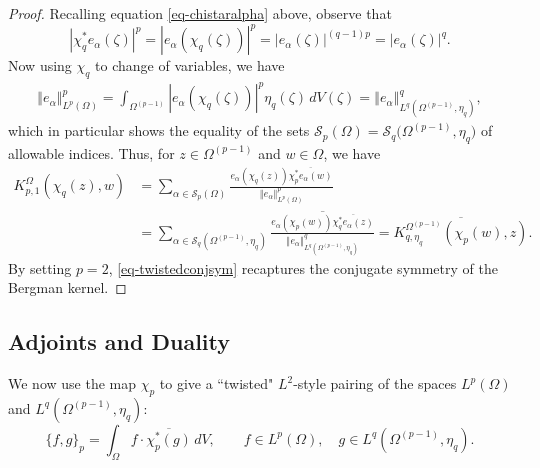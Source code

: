 \documentclass[letterpaper,11pt,reqno]{amsart}
\theoremstyle{plain}
\theoremstyle{definition}
\theoremstyle{remark}
\theoremstyle{remark}
\numberwithin{equation}{section}
\newcommand{\abs}[1]{\left\vert#1\right\vert}
\newcommand{\norm}[1]{\left\Vert#1\right\Vert}
\newcommand{\ol}{\overline}
\newcommand{\cs}{{\mathcal S}}
\begin{document}
\begin{proof}
Recalling equation \eqref{eq-chistaralpha} above, observe that
\[
\abs{\chi_q^* e_\alpha(\zeta)}^p= \abs{e_\alpha(\chi_q(\zeta))}^p = \abs{e_\alpha(\zeta)}^{(q-1)p} = \abs{e_\alpha(\zeta)}^q.
\]
Now using $\chi_q$ to change of variables, we have
\begin{align*} 
\norm{e_\alpha}^p_{L^p(\Omega)} 
= \int_{\Omega^{(p-1)}} \abs{e_\alpha(\chi_q(\zeta))}^p \eta_q(\zeta) \,dV(\zeta)
= \norm{e_\alpha}^q_{L^q(\Omega^{(p-1)},\eta_q)}, 
\end{align*}
which in particular shows the equality of the sets $\cs_p(\Omega) = \cs_q\big(\Omega^{(p-1)},\eta_q\big)$ of allowable indices. 
Thus, for $z \in \Omega^{(p-1)}$ and $w \in \Omega$, we have
\begin{align*}
K^{\Omega}_{p,1}\left(\chi_q(z),w\right)  
&= \sum_{\alpha \in \cs_p(\Omega)} \frac{e_\alpha(\chi_q(z)) \ol{\chi_p^* e_\alpha(w)}}{\norm{e_\alpha}_{L^p(\Omega)}^p} \\
&= \sum_{\alpha \in \cs_q(\Omega^{(p-1)},\eta_q)} \ol{\frac{ e_\alpha(\chi_p(w)) \ol{\chi_q^* e_\alpha(z)}}{\norm{e_\alpha}^q_{L^q(\Omega^{(p-1)},\eta_q)}} } 
= \ol{{K^{\Omega^{(p-1)}}_{q,\eta_q}(\chi_p(w),z)}}.
\end{align*}
By setting $p=2$, \eqref{eq-twistedconjsym} recaptures the conjugate symmetry of the Bergman kernel.
\end{proof}

\subsection{Adjoints and Duality}\label{SS:adjoints-and-duality}
We now use the map $\chi_p$ to give a ``twisted" $L^2$-style pairing of the spaces $L^p(\Omega)$ and $L^q(\Omega^{(p-1)},\eta_q)$:
\begin{equation}\label{eq-new-pairing}
\{f,g\}_{p} = \int_\Omega f \cdot \ol{\chi_p^*(g)} \,dV, \qquad f \in L^p(\Omega), \quad g \in L^q(\Omega^{(p-1)},\eta_q).
\end{equation}
\end{document}
